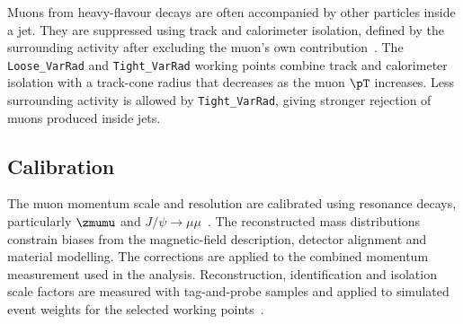Muons from heavy-flavour decays are often accompanied by other particles inside a jet.
They are suppressed using track and calorimeter isolation, defined by the surrounding activity after excluding the muon's own contribution~\cite{ATLAS2021MuonID}.
The \texttt{Loose\_VarRad} and \texttt{Tight\_VarRad} working points combine track and calorimeter isolation with a track-cone radius that decreases as the muon $\pT$ increases.
Less surrounding activity is allowed by \texttt{Tight\_VarRad}, giving stronger rejection of muons produced inside jets.

\subsection{Calibration}

The muon momentum scale and resolution are calibrated using resonance decays, particularly $\zmumu$ and $J/\psi\rightarrow\mu\mu$~\cite{ATLAS2023MuonCalibration}.
The reconstructed mass distributions constrain biases from the magnetic-field description, detector alignment and material modelling.
The corrections are applied to the combined momentum measurement used in the analysis.
Reconstruction, identification and isolation scale factors are measured with tag-and-probe samples and applied to simulated event weights for the selected working points~\cite{ATLAS2021MuonID}.
